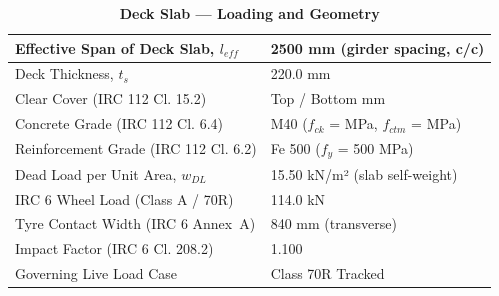 \documentclass{article}
\begin{document}
\vspace{1em}
\begin{longtable}{|L{5.5cm}|p{10.0cm}|}
\caption{\textbf{Deck Slab --- Loading and Geometry}}
\hline
\textnormal{Effective Span of Deck Slab, $l_{eff}$} & 2500 mm (girder spacing, c/c) \\[6pt]
\hline
\textnormal{Deck Thickness, $t_s$} & 220.0 mm \\[6pt]
\hline
\textnormal{Clear Cover (IRC 112 Cl. 15.2)} & Top  / Bottom  mm \\[6pt]
\hline
\textnormal{Concrete Grade (IRC 112 Cl. 6.4)} & M40 ($f_{ck}$ =  MPa, $f_{ctm}$ =  MPa) \\[6pt]
\hline
\textnormal{Reinforcement Grade (IRC 112 Cl. 6.2)} & Fe 500 ($f_y$ = 500 MPa) \\[6pt]
\hline
\textnormal{Dead Load per Unit Area, $w_{DL}$} & 15.50 kN/m² (slab self-weight) \\[6pt]
\hline
\textnormal{IRC 6 Wheel Load (Class A / 70R)} & 114.0 kN \\[6pt]
\hline
\textnormal{Tyre Contact Width (IRC 6 Annex~A)} & 840 mm (transverse) \\[6pt]
\hline
\textnormal{Impact Factor (IRC 6 Cl. 208.2)} & 1.100 \\[6pt]
\hline
\textnormal{Governing Live Load Case} & Class 70R Tracked \\[6pt]
\hline
\end{longtable}
\end{document}
